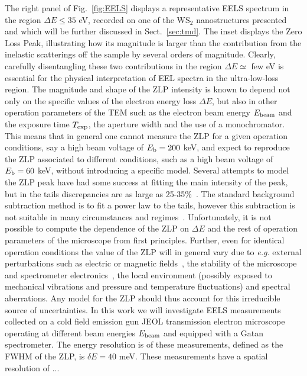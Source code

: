 The right panel of Fig.~\ref{fig:EELS} displays
a representative EELS spectrum in the region $\Delta E \le 35$ eV, recorded
on one of the WS$_2$ nanostructures presented~\cite{SabryaWS2}
and which will be further discussed in Sect.~\ref{sec:tmd}.
%
The inset displays the Zero Loss Peak, illustrating how
its magnitude is larger than the contribution from the inelastic scatterings
off the sample by several
orders of magnitude.
%
Clearly, carefully disentangling these two contributions in the region $\Delta E \simeq$ few eV
is essential for the physical interpretation of EEL spectra in the ultra-low-loss region.
%
The magnitude and shape of the ZLP intensity is known to depend not only on the specific values
of the electron energy loss $\Delta E$, but also in other operation parameters
of the TEM such as the electron beam energy $E_{\rm beam}$ and the exposure time
$T_{\rm exp}$, the aperture width and the use of a monochromator. 
%
This means that in general one cannot measure the ZLP for a given operation
conditions, say a high beam voltage of $E_{\rm b}=200$ keV, and expect to reproduce
the ZLP associated to different conditions, such as a  high beam voltage of $E_{\rm b}=60$ keV,
without introducing a specific model.
%
Several attempts to model the ZLP peak have had some success at fitting the main intensity of the peak, 
but in the tails discrepancies are as large as 25-35\%~\cite{Bangert:2003}.
%
The standard background 
subtraction method is to fit a power law to the tails, however this subtraction is not suitable in
many circumstances and regimes~\cite{Hachtel:2018, Tenailleau:1992, Reed:2002, Bosman:2006}.
%
Unfortunately, it is not possible to compute the dependence of the ZLP on $\Delta E$
and the rest of operation parameters of the microscope from first principles.
%
Further, even for identical operation conditions the value of the ZLP
will in general vary due to {\it e.g.} external perturbations such as electric or magnetic fields~\cite{Rafferty:2000},
the stability of the microscope and spectrometer electronics~\cite{Kothleitner:2003}, the local
environment (possibly exposed to mechanical vibrations and pressure and temperature fluctuations) 
and spectral aberrations\cite{Egerton:1996, Scherzer:1949}. 
%
Any model for the ZLP should thus account for this irreducible source of uncertainties.
%
In this work we will investigate EELS measurements collected  on a cold field emission gun JEOL
transmission electron microscope operating at different beam energies $E_{\rm beam}$
and equipped with a  Gatan spectrometer.
%
The energy resolution is of these measurements,
defined as the FWHM of the ZLP, is $\delta E=40$ meV.
%
These measurements have a spatial resolution of ...

